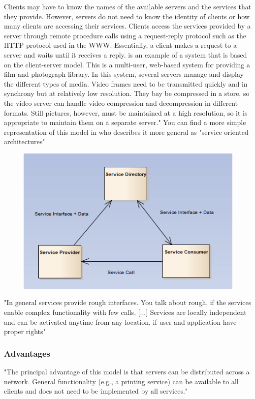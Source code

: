 Clients may have to know the names of the available servers and the services that they provide. However, servers do not need to know the identity of clients or how many clients are accessing their services. Clients access the services provided by a server through remote procedure calls using a request-reply protocol such as the HTTP protocol used in the WWW. Essentially, a client makes a request to a server and waits until it receives a reply.
 is an example of a system that is based on the client-server model. This is a multi-user, web-based system for providing a film and photograph library. In this system, several servers manage and display the different types of media. Video frames need to be transmitted quickly and in synchrony but at relatively low resolution. They bay be compressed in a store, so the video server can handle video compression and decompression in different formats. Still pictures, however, must be maintained at a high resolution, so it is appropriate to maintain them on a separate server." \citep{sommerville} \vfill
\pagebreak
You can find a more simple representation of this model in \citep{starke_rausch} who describes it more general as "service oriented architectures"
\begin{figure}[!hbp]
\includegraphics[width=0.9\columnwidth]{img/pics/soa.PNG}
\caption{ \protect \cite{starke_rausch}}
\label{fig:ref_soa}
\end{figure}
"In general services provide rough interfaces. You talk about rough, if the services enable complex functionality with few calls. [...] Services are locally independent and can be activated anytime from any location, if user and application have proper rights" \citep{starke_rausch}
\subsubsection{Advantages}
"The principal advantage of this model is that servers can be distributed across a network. General functionality (e.g., a printing service) can be available to all clients and does not need to be implemented by all services."\citep{sommerville}
